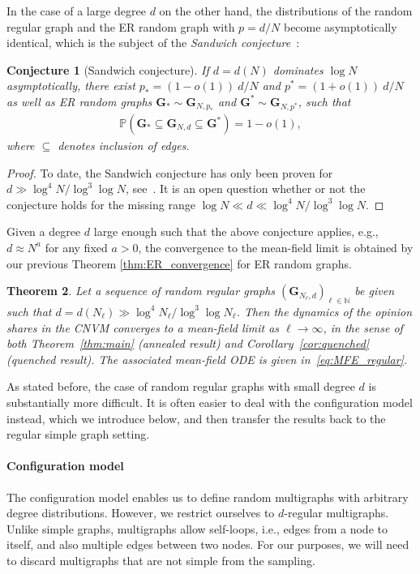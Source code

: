 \documentclass[a4paper,
               10pt,
               pdftex,
               normalheadings,
               headsepline,
               footsepline,
               headinclude,
               footinclude,
               DIV=14,
               abstracton]
{scrartcl}
\newtheorem{theorem}{Theorem}[section]
\newtheorem{conjecture}[theorem]{Conjecture}
\newcommand{\rv}[1]{\bm{#1}}
\newcommand{\review}[1]{{#1}}
\begin{document}
\review{
In the case of a large degree $d$ on the other hand, the distributions of the random regular graph and the ER random graph with $p=d/N$ become asymptotically identical, which is the subject of the \textit{Sandwich conjecture}~\cite{Kim2004}:
\begin{conjecture}[Sandwich conjecture] \label{sandwich_conjecture}
    If $d = d(N)$ dominates $\log N$ asymptotically, there exist $p_* = (1 - o(1))\ d/N$ and $p^* = (1 + o(1))\ d/N$ as well as ER random graphs $\rv{G}_* \sim \rv{G}_{N, p_*}$ and $\rv{G}^* \sim \rv{G}_{N, p^*}$, such that
    \begin{align}
        \mathbb{P}(\rv{G}_* \subseteq \rv{G}_{N, d} \subseteq \rv{G}^*) = 1 - o(1),
    \end{align}
    where $\subseteq$ denotes inclusion of edges.
\end{conjecture}
\begin{proof}
    To date, the Sandwich conjecture has only been proven for $d \gg \log^4 N / \log^3 \log N$, see~\cite{Gao2020}. It is an open question whether or not the conjecture holds for the missing range $\log N \ll d \ll \log^4 N / \log^3 \log N$.
\end{proof}
Given a degree $d$ large enough such that the above conjecture applies, e.g., $d \approx N^a$ for any fixed $a > 0$, the convergence to the mean-field limit is obtained by our previous Theorem \ref{thm:ER_convergence} for ER random graphs.
\begin{theorem} \label{thm:regular_sandwich}
    Let a sequence of random regular graphs $(\rv{G}_{N_\ell, d})_{\ell \in \mathbb{N}}$ be given such that $d = d(N_\ell) \gg \log^4 N_\ell / \log^3 \log N_\ell$. Then the dynamics of the opinion shares in the CNVM converges to a mean-field limit as $\ell \to \infty$, in the sense of both Theorem~\ref{thm:main} (annealed result) and Corollary~\ref{cor:quenched} (quenched result). The associated mean-field ODE is given in~\eqref{eq:MFE_regular}.
\end{theorem}
}

As stated before, the case of random regular graphs with small degree $d$ is substantially more difficult.
It is often easier to deal with the configuration model instead, which we introduce below, and then transfer the results back to the regular simple graph setting.

\paragraph{Configuration model}
The configuration model \cite[section 11.1]{Frieze2015} enables us to define random multigraphs with arbitrary degree distributions. However, we restrict ourselves to $d$-regular multigraphs.
Unlike simple graphs, multigraphs allow self-loops, i.e., edges from a node to itself, and also multiple edges between two nodes. For our purposes, we will need to discard multigraphs that are not simple from the sampling.
\end{document}
